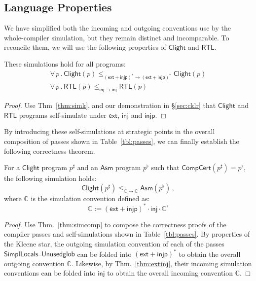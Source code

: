 \documentclass[sigplan,10pt,review,anonymous]{acmart}
\newcommand{\kw}[1]{\ensuremath{ \mathsf{#1} }}
\begin{document}

\subsection{Language Properties} %

We have simplified both the incoming and outgoing conventions
use by the whole-compiler simulation,
but they remain distinct and incomparable.
To reconcile them,
we will use the following properties
of \kw{Clight} and \kw{RTL}.

\begin{theorem} \label{thm:lprops} %
These simulations hold
for all programs:
\begin{gather*}
\forall \, p \,.\,
  \kw{Clight}(p)
  \le_{(\kw{ext} + \kw{injp})^* \rightarrow (\kw{ext} + \kw{injp})^*}
  \kw{Clight}(p) \\
\forall \, p \,.\,
  \kw{RTL}(p)
  \le_{\kw{inj} \rightarrow \kw{inj}}
  \kw{RTL}(p)
\end{gather*}
\begin{proof}
Use Thm~\ref{thm:simk},
and our demonstration in \S\ref{sec:cklr} that
\kw{Clight} and \kw{RTL} programs self-simulate under
$\kw{ext}$, $\kw{inj}$ and $\kw{injp}$.
\end{proof}
\end{theorem}

By introducing these self-simulations
at strategic points in the overall composition of passes
shown in Table~\ref{tbl:passes},
we can finally establish the following correctness theorem.

\begin{theorem} %
For a \kw{Clight} program $p^\sharp$
and an \kw{Asm} program $p^\flat$ such that
$\kw{CompCert}(p^\sharp) = p^\flat$,
the following simulation holds:
\[
    \kw{Clight}(p^\sharp) \le_{\mathbb{C} \rightarrow \mathbb{C}}
    \kw{Asm}(p^\flat) \,,
\]
where $\mathbb{C}$ is the simulation convention defined as:
\[
    \mathbb{C} := (\kw{ext} + \kw{injp})^* \cdot \kw{inj} \cdot
      \mathbb{C}^\flat
\]
\begin{proof}
Use Thm.~\ref{thm:simcomp} to compose
the correctness proofs of the compiler passes and
self-simulations shown in Table~\ref{tbl:passes}.
By properties of the Kleene star,
the outgoing simulation convention of each of the
passes \kw{SimplLocals}--\kw{Unusedglob}
can be folded into $(\kw{ext} + \kw{injp})^*$
to obtain the overall outgoing convention $\mathbb{C}$.
Likewise, by Thm.~\ref{thm:extinj},
their incoming simulation conventions
can be folded into $\kw{inj}$
to obtain the overall incoming convention $\mathbb{C}$.
\end{proof}
\end{theorem}
\end{document}
